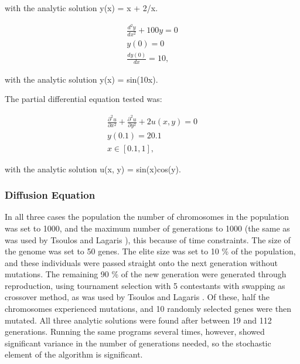 \documentclass[multicolumn, 12pt]{extarticle}
\begin{document}
with the analytic solution y(x) = x + 2/x.

\begin{align}
\label{eq:ODE}
	\frac{d^{2}y}{dx^{2}}  + 100y = 0 \\
	y(0) = 0    \\
	\frac{dy(0)}{dx} = 10,
\end{align}

with the analytic solution y(x) = sin(10x).

The partial differential equation tested was:

\begin{align}
\label{eq:PDE}
	\frac{\partial^{2}u}{\partial x^{2}} + \frac{\partial^{2}u}{\partial y^{2}} + 2u(x, y) = 0 \\
	y(0.1) = 20.1       \\
	x \in [0.1, 1],
\end{align}

with the analytic solution u(x, y) = sin(x)cos(y).

\subsubsection{Diffusion Equation}
In all three cases the population the number of chromosomes in the population was set to 1000, and the maximum number of generations to 1000 (the same as was used by Tsoulos and Lagaris \cite{Lagaris}), this because of time constraints. The size of the genome was set to 50 genes. The elite size was set to 10 \% of the population, and these individuals were passed straight onto the next generation without mutations. The remaining 90 \% of the new generation were generated through reproduction, using tournament selection with 5 contestants with swapping as crossover method, as was used by Tsoulos and Lagaris \cite{Lagaris}. Of these, half the chromosomes experienced mutations, and 10 randomly selected genes were then mutated. All three analytic solutions were found after between 19 and 112 generations. Running the same programs several times, however, showed significant variance in the number of generations needed, so the stochastic element of the algorithm is significant.
\end{document}
